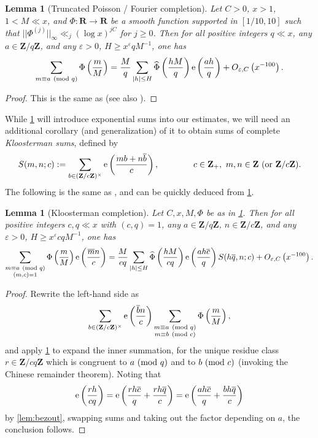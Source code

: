 \documentclass[reqno,11pt]{amsart}
\newtheorem{lemma}[theorem]{Lemma}
\theoremstyle{definition}
\theoremstyle{remark}
\numberwithin{equation}{section}
\newcommand{\Z}{\mathbf{Z}}
\newcommand{\R}{\mathbf{R}}
\newcommand{\e}{\textnormal{e}}
\newcommand{\eps}{\varepsilon}
\renewcommand{\bar}{\overline}
\renewcommand{\hat}{\widehat}
\renewcommand{\pmod}[1]{\ (\textnormal{mod } #1)}
\begin{document}
\begin{lemma}[Truncated Poisson / Fourier completion] \label{lem:poisson}
Let $C > 0$, $x > 1$, $1 < M \ll x$, and $\Phi : \R \to \R$ be a smooth function supported in $[1/10, 10]$ such that $||\Phi^{(j)}||_\infty \ll_j (\log x)^{jC}$ for $j \ge 0$. Then for all positive integers $q \ll x$, any $a \in \Z/q\Z$, and any $\eps > 0$, $H \ge x^{\eps} qM^{-1}$, one has
\[
    \sum_{m \equiv a \pmod{q}} \Phi\left(\frac{m}{M}\right) = \frac{M}{q} \sum_{|h| \le H} \hat{\Phi} \left(\frac{hM}{q} \right) \e\left(\frac{ah}{q}\right)
    + 
    O_{\eps,C}\left(x^{-100}\right).
\]
\end{lemma}

\begin{proof}
This is the same as \cite[Lemma 13.4]{maynard2020primes} (see also \cite[Lemme 2]{drappeau2015theoremes}).
\end{proof}

While \cref{lem:poisson} will introduce exponential sums into our estimates, we will need an additional corollary (and generalization) of it to obtain sums of complete \emph{Kloosterman sums}, defined by
\[
    S(m, n; c) := \sum_{b \in (\Z/c\Z)^\times} 
    \e\left(\frac{mb + n\bar{b}}{c}\right),
    \qquad\qquad 
    c \in \Z_+,\ m, n \in \Z \textnormal{ (or $\Z/c\Z$)}.
\]
The following is the same as \cite[Lemma 13.5]{maynard2020primes}, and can be quickly deduced from \cref{lem:poisson}.

\begin{lemma}[Kloosterman completion] \label{lem:completion}
Let $C, x, M, \Phi$ be as in \cref{lem:poisson}. Then for all positive integers $c, q \ll x$ with $(c, q) = 1$, any $a \in \Z/q\Z$, $n \in \Z/c\Z$, and any $\eps > 0$, $H \ge x^\eps cq M^{-1}$, one has
\[
    \sum_{\substack{m \equiv a \pmod{q} \\ (m, c) = 1}} 
    \Phi\left(\frac{m}{M}\right) \e\left(\frac{\bar{m}n}{c}\right)
    =
    \frac{M}{cq} \sum_{|h| \le H} \hat{\Phi}\left(\frac{hM}{cq}\right) \e\left(\frac{ah \bar{c}}{q}\right)
    S(h\bar{q}, n; c)
    +  
    O_{\eps, C}\left(x^{-100}\right).
\] %
\end{lemma} %
\begin{proof}
Rewrite the left-hand side as
\[
    \sum_{b \in (\Z/c\Z)^\times} \e\left(\frac{\bar{b} n}{c} \right)
    \sum_{\substack{m \equiv a \pmod{q} \\ m \equiv b \pmod{c}}} \Phi\left(\frac{m}{M}\right),
\]
and apply \cref{lem:poisson} to expand the inner summation, for the unique residue class $r \in \Z/cq\Z$ which is congruent to $a \pmod{q}$ and to $b \pmod{c}$ (invoking the Chinese remainder theorem). Noting that
\[
    \e \left(\frac{rh}{cq}\right)
    =
    \e \left(\frac{rh \bar{c}}{q} + \frac{rh \bar{q}}{c}\right)
    =
    \e \left(\frac{ah \bar{c}}{q} + \frac{bh \bar{q}}{c}\right)
\]
by \cref{lem:bezout}, swapping sums and taking out the factor depending on $a$, the conclusion follows.
\end{proof}
\end{document}
